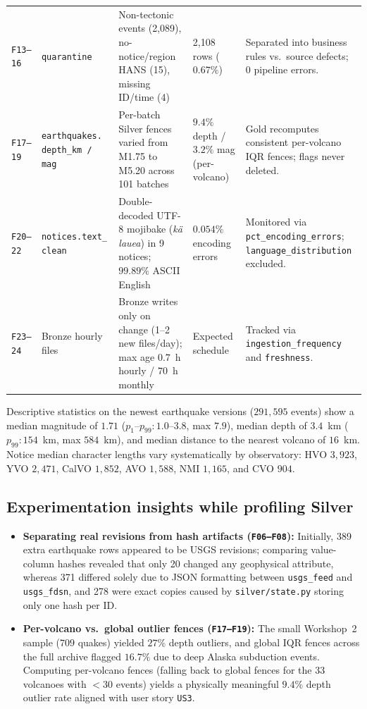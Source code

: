 \documentclass[11pt,a4paper]{article}
\begin{document}
\begin{longtable}{L{0.8cm}L{3.1cm}L{4.0cm}L{2.5cm}L{3.8cm}}
\texttt{F13--16} & \texttt{quarantine} & Non-tectonic events (2,089), no-notice/region HANS (15), missing ID/time (4) & 2,108 rows ($0.67\%$) & Separated into business rules vs.\ source defects; 0 pipeline errors.\\
\texttt{F17--19} & \texttt{earthquakes. depth\_km / mag} & Per-batch Silver fences varied from M1.75 to M5.20 across 101 batches & $9.4\%$ depth / $3.2\%$ mag (per-volcano) & Gold recomputes consistent per-volcano IQR fences; flags never deleted.\\
\texttt{F20--22} & \texttt{notices.text\_ clean} & Double-decoded UTF-8 mojibake (\emph{kä lauea}) in 9 notices; $99.89\%$ ASCII English & $0.054\%$ encoding errors & Monitored via \texttt{pct\_encoding\_errors}; \texttt{language\_distribution} excluded.\\
\texttt{F23--24} & Bronze hourly files & Bronze writes only on change (1--2 new files/day); max age $0.7$~h hourly / $70$~h monthly & Expected schedule & Tracked via \texttt{ingestion\_frequency} and \texttt{freshness}.\\
\bottomrule
\end{longtable}

Descriptive statistics on the newest earthquake versions ($291,595$ events) show a median magnitude of $1.71$ ($p_1\text{--}p_{99}: 1.0\text{--}3.8$, max $7.9$), median depth of $3.4$~km ($p_{99}: 154$~km, max $584$~km), and median distance to the nearest volcano of $16$~km. Notice median character lengths vary systematically by observatory: HVO $3,923$, YVO $2,471$, CalVO $1,852$, AVO $1,588$, NMI $1,165$, and CVO $904$.

\subsection{Experimentation insights while profiling Silver}
\begin{itemize}
  \item \textbf{Separating real revisions from hash artifacts (\texttt{F06--F08}):} Initially, 389 extra earthquake rows appeared to be USGS revisions; comparing value-column hashes revealed that only 20 changed any geophysical attribute, whereas 371 differed solely due to JSON formatting between \texttt{usgs\_feed} and \texttt{usgs\_fdsn}, and 278 were exact copies caused by \texttt{silver/state.py} storing only one hash per ID.
  \item \textbf{Per-volcano vs.\ global outlier fences (\texttt{F17--F19}):} The small Workshop~2 sample ($709$ quakes) yielded $27\%$ depth outliers, and global IQR fences across the full archive flagged $16.7\%$ due to deep Alaska subduction events. Computing per-volcano fences (falling back to global fences for the 33 volcanoes with $<30$ events) yields a physically meaningful $9.4\%$ depth outlier rate aligned with user story \texttt{US3}.
\end{itemize}
\end{document}
